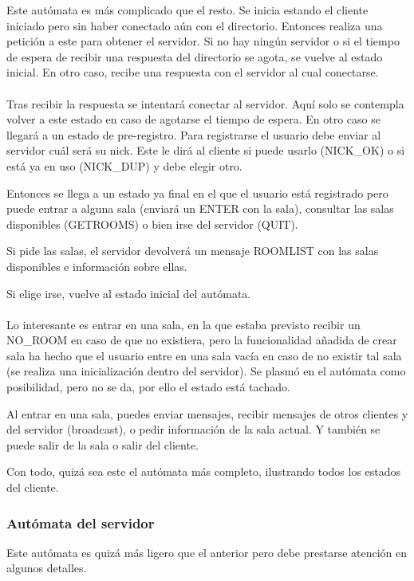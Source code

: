\documentclass{article}
\begin{document}
Este autómata es más complicado que el resto. Se inicia estando el cliente iniciado pero sin haber conectado aún con el directorio. Entonces realiza una petición a este para obtener el servidor. Si no hay ningún servidor o si el tiempo de espera de recibir una respuesta del directorio se agota, se vuelve al estado inicial. En otro caso, recibe una respuesta con el servidor al cual conectarse.\\\\

Tras recibir la respuesta se intentará conectar al servidor. Aquí solo se contempla volver a este estado en caso de agotarse el tiempo de espera. En otro caso se llegará a un estado de pre-registro. Para registrarse el usuario debe enviar al servidor cuál será su nick. Este le dirá al cliente si puede usarlo (NICK\_OK) o si está ya en uso (NICK\_DUP) y debe elegir otro.

Entonces se llega a un estado ya final en el que el usuario está registrado pero puede entrar a alguna sala (enviará un ENTER con la sala), consultar las salas disponibles (GETROOMS) o bien irse del servidor (QUIT).

Si pide las salas, el servidor devolverá un mensaje ROOMLIST con las salas disponibles e información sobre ellas.

Si elige irse, vuelve al estado inicial del autómata.\\\\

Lo interesante es entrar en una sala, en la que estaba previsto recibir un NO\_ROOM en caso de que no existiera, pero la funcionalidad añadida de crear sala ha hecho que el usuario entre en una sala vacía en caso de no existir tal sala (se realiza una inicialización dentro del servidor). Se plasmó en el autómata como posibilidad, pero no se da, por ello el estado está tachado.

Al entrar en una sala, puedes enviar mensajes, recibir mensajes de otros clientes y del servidor (broadcast), o pedir información de la sala actual. Y también se puede salir de la sala o salir del cliente.

Con todo, quizá sea este el autómata más completo, ilustrando todos los estados del cliente.

\subsubsection{Autómata del servidor}

Este autómata es quizá más ligero que el anterior pero debe prestarse atención en algunos detalles.
\end{document}
